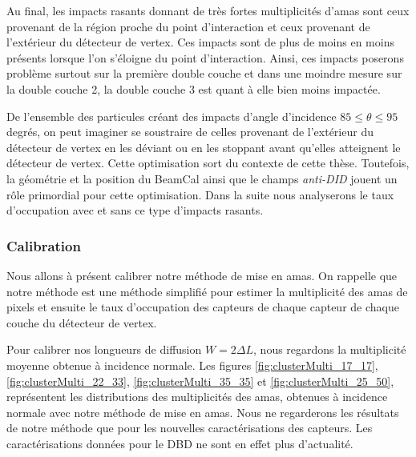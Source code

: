   Au final, les impacts rasants donnant de tr\`es fortes multiplicit\'es d'amas sont ceux provenant de la r\'egion proche du point d'interaction et ceux provenant de l'extérieur du d\'etecteur de vertex. Ces impacts sont de plus de moins en moins pr\'esents  lorsque l'on s'\'eloigne du point d'interaction. Ainsi, ces impacts poserons probl\`eme surtout sur la premi\`ere double couche et dans une moindre mesure sur la double couche 2, la double couche 3 est quant \`a elle bien moins impact\'ee.
  
  \medskip
  
  De l'ensemble des particules cr\'eant des impacts d'angle d'incidence $85 \leq \theta \leq 95$ degr\'es, on peut imaginer se soustraire de celles provenant de l'ext\'erieur du d\'etecteur de vertex en les d\'eviant ou en les stoppant avant qu'elles atteignent le d\'etecteur de vertex. Cette optimisation sort du contexte de cette th\`ese. Toutefois, la g\'eom\'etrie et la position du BeamCal ainsi que le champs \textit{anti-DID} jouent un r\^ole primordial pour cette optimisation. Dans la suite nous analyserons le taux d'occupation avec et sans ce type d'impacts rasants.
  
  \subsubsection{Calibration}
 
  Nous allons \`a pr\'esent calibrer notre m\'ethode de mise en amas. On rappelle que notre m\'ethode est une m\'ethode simplifi\'e pour estimer la multiplicit\'e des amas de pixels et ensuite le taux d'occupation des capteurs de chaque capteur de chaque couche du d\'etecteur de vertex.
  
  \medskip
  
  Pour calibrer nos longueurs de diffusion $W = 2 \Delta L$, nous regardons la multiplicit\'e moyenne obtenue \`a incidence normale. Les figures \ref{fig:clusterMulti_17_17}, \ref{fig:clusterMulti_22_33}, \ref{fig:clusterMulti_35_35} et \ref{fig:clusterMulti_25_50}, repr\'esentent les distributions des multiplicit\'es des amas, obtenues \`a incidence normale avec notre m\'ethode de mise en amas. 
  Nous ne regarderons les r\'esultats de notre m\'ethode que pour les nouvelles caract\'erisations des capteurs. Les caract\'erisations donn\'ees pour le DBD ne sont en effet plus d'actualit\'e.

